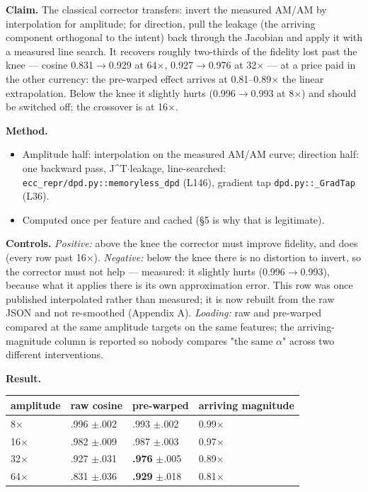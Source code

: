\documentclass[10pt]{article}
\begin{document}
\textbf{Claim.} The classical corrector transfers: invert the measured AM/AM by interpolation for
amplitude; for direction, pull the leakage (the arriving component orthogonal to the intent) back
through the Jacobian and apply it with a measured line search. It recovers roughly two-thirds of
the fidelity lost past the knee --- cosine 0.831$\to$0.929 at 64$\times$, 0.927$\to$0.976 at 32$\times$ --- at a price paid
in the other currency: the pre-warped effect arrives at 0.81--0.89$\times$ the linear extrapolation.
Below the knee it slightly hurts (0.996$\to$0.993 at 8$\times$) and should be switched off; the crossover is
at 16$\times$.

\textbf{Method.}
\begin{itemize}\setlength\itemsep{1pt}
\item Amplitude half: interpolation on the measured AM/AM curve; direction half: one backward pass, J\textasciicircum{}T$\cdot$leakage, line-searched: \texttt{ecc\_repr/dpd.py::memoryless\_dpd} (L146), gradient tap \texttt{dpd.py::\_GradTap} (L36).
\item Computed once per feature and cached (§5 is why that is legitimate).
\end{itemize}
\textbf{Controls.} \emph{Positive:} above the knee the corrector must improve fidelity, and does (every row
past 16$\times$). \emph{Negative:} below the knee there is no distortion to invert, so the corrector must not
help --- measured: it slightly hurts (0.996$\to$0.993), because what it applies there is its own
approximation error. This row was once published interpolated rather than measured; it is now
rebuilt from the raw JSON and not re-smoothed (Appendix A). \emph{Loading:} raw and pre-warped compared
at the same amplitude targets on the same features; the arriving-magnitude column is reported so
nobody compares "the same $\alpha$" across two different interventions.

\textbf{Result.}

\begin{center}\small\begin{tabular}{llll}
\toprule
amplitude & raw cosine & pre-warped & arriving magnitude \\
\midrule
8$\times$ & .996 $\pm$.002 & .993 $\pm$.002 & 0.99$\times$ \\
16$\times$ & .982 $\pm$.009 & .987 $\pm$.003 & 0.97$\times$ \\
32$\times$ & .927 $\pm$.031 & \textbf{.976} $\pm$.005 & 0.89$\times$ \\
64$\times$ & .831 $\pm$.036 & \textbf{.929} $\pm$.018 & 0.81$\times$ \\
\bottomrule
\end{tabular}\end{center}
\end{document}
